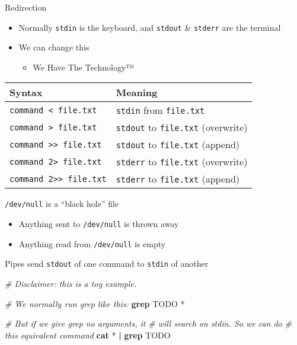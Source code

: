 \documentclass[ignorenonframetext,]{beamer}
\newenvironment{Shaded}{}{}
\newcommand{\KeywordTok}[1]{\textcolor[rgb]{0.00,0.44,0.13}{\textbf{{#1}}}}
\newcommand{\CommentTok}[1]{\textcolor[rgb]{0.38,0.63,0.69}{\textit{{#1}}}}
\newcommand{\NormalTok}[1]{{#1}}
\providecommand{\tightlist}{%
  \setlength{\itemsep}{0pt}\setlength{\parskip}{0pt}}
\begin{document}
\begin{frame}[fragile]{Redirection}

\begin{itemize}
\tightlist
\item
  Normally \texttt{stdin} is the keyboard, and \texttt{stdout} \&
  \texttt{stderr} are the terminal
\item
  We can change this

  \begin{itemize}
  \tightlist
  \item
    We Have The Technology™
  \end{itemize}
\end{itemize}

\begin{longtable}[]{@{}ll@{}}
\toprule
Syntax & Meaning\tabularnewline
\midrule
\endhead
\texttt{command\ \textless{}\ file.txt} & \texttt{stdin} from
\texttt{file.txt}\tabularnewline
\texttt{command\ \textgreater{}\ file.txt} & \texttt{stdout} to
\texttt{file.txt} (overwrite)\tabularnewline
\texttt{command\ \textgreater{}\textgreater{}\ file.txt} &
\texttt{stdout} to \texttt{file.txt} (append)\tabularnewline
\texttt{command\ 2\textgreater{}\ file.txt} & \texttt{stderr} to
\texttt{file.txt} (overwrite)\tabularnewline
\texttt{command\ 2\textgreater{}\textgreater{}\ file.txt} &
\texttt{stderr} to \texttt{file.txt} (append)\tabularnewline
\bottomrule
\end{longtable}

\end{frame}

\begin{frame}[fragile]{\texttt{/dev/null} is a ``black hole'' file}

\begin{itemize}
\tightlist
\item
  Anything sent to \texttt{/dev/null} is thrown away
\item
  Anything read from \texttt{/dev/null} is empty
\end{itemize}

\end{frame}

\begin{frame}[fragile]{Pipes send \texttt{stdout} of one command to
\texttt{stdin} of another}

\begin{Shaded}
\begin{Highlighting}[]
\CommentTok{# Disclaimer: this is a toy example.}

\CommentTok{# We normally run grep like this:}
\KeywordTok{grep} \NormalTok{TODO *}

\CommentTok{# But if we give grep no arguments, it}
\CommentTok{# will search on stdin. So we can do}
\CommentTok{# this equivalent command}
\KeywordTok{cat} \NormalTok{* }\KeywordTok{|} \KeywordTok{grep} \NormalTok{TODO}
\end{Highlighting}
\end{Shaded}

\end{frame}
\end{document}
